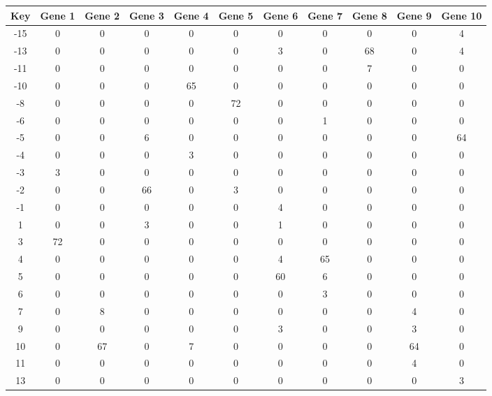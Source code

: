 \begin{tabular}{|c|c|c|c|c|c|c|c|c|c|c|}
\hline
Key & Gene 1 & Gene 2 & Gene 3 & Gene 4 & Gene 5 & Gene 6 & Gene 7 & Gene 8 & Gene 9 & Gene 10 \\
\hline
-15 & 0 & 0 & 0 & 0 & 0 & 0 & 0 & 0 & 0 & 4 \\
-13 & 0 & 0 & 0 & 0 & 0 & 3 & 0 & 68 & 0 & 4 \\
-11 & 0 & 0 & 0 & 0 & 0 & 0 & 0 & 7 & 0 & 0 \\
-10 & 0 & 0 & 0 & 65 & 0 & 0 & 0 & 0 & 0 & 0 \\
-8 & 0 & 0 & 0 & 0 & 72 & 0 & 0 & 0 & 0 & 0 \\
-6 & 0 & 0 & 0 & 0 & 0 & 0 & 1 & 0 & 0 & 0 \\
-5 & 0 & 0 & 6 & 0 & 0 & 0 & 0 & 0 & 0 & 64 \\
-4 & 0 & 0 & 0 & 3 & 0 & 0 & 0 & 0 & 0 & 0 \\
-3 & 3 & 0 & 0 & 0 & 0 & 0 & 0 & 0 & 0 & 0 \\
-2 & 0 & 0 & 66 & 0 & 3 & 0 & 0 & 0 & 0 & 0 \\
-1 & 0 & 0 & 0 & 0 & 0 & 4 & 0 & 0 & 0 & 0 \\
1 & 0 & 0 & 3 & 0 & 0 & 1 & 0 & 0 & 0 & 0 \\
3 & 72 & 0 & 0 & 0 & 0 & 0 & 0 & 0 & 0 & 0 \\
4 & 0 & 0 & 0 & 0 & 0 & 4 & 65 & 0 & 0 & 0 \\
5 & 0 & 0 & 0 & 0 & 0 & 60 & 6 & 0 & 0 & 0 \\
6 & 0 & 0 & 0 & 0 & 0 & 0 & 3 & 0 & 0 & 0 \\
7 & 0 & 8 & 0 & 0 & 0 & 0 & 0 & 0 & 4 & 0 \\
9 & 0 & 0 & 0 & 0 & 0 & 3 & 0 & 0 & 3 & 0 \\
10 & 0 & 67 & 0 & 7 & 0 & 0 & 0 & 0 & 64 & 0 \\
11 & 0 & 0 & 0 & 0 & 0 & 0 & 0 & 0 & 4 & 0 \\
13 & 0 & 0 & 0 & 0 & 0 & 0 & 0 & 0 & 0 & 3 \\
\hline
\end{tabular}
